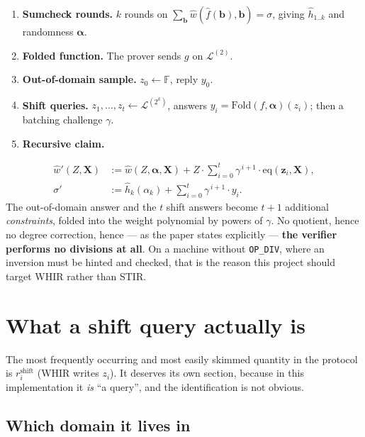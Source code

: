 \documentclass[11pt,a4paper]{article}
\newcommand{\eqp}{\mathrm{eq}}
\newcommand{\Fold}{\mathrm{Fold}}
\begin{document}
\begin{enumerate}
  \item \textbf{Sumcheck rounds.} $k$ rounds on
        $\sum_{\boldsymbol b}\hat w(\hat f(\boldsymbol b),\boldsymbol b)=\sigma$, giving
        $\hat h_{1..k}$ and randomness $\boldsymbol\alpha$.
  \item \textbf{Folded function.} The prover sends $g$ on $\mathcal{L}^{(2)}$.
  \item \textbf{Out-of-domain sample.} $z_{0}\leftarrow\mathbb{F}$, reply $y_{0}$.
  \item \textbf{Shift queries.} $z_{1},\dots,z_{t}\leftarrow\mathcal{L}^{(2^{k})}$, answers
        $y_{i}=\Fold(f,\boldsymbol\alpha)(z_{i})$; then a batching challenge $\gamma$.
  \item \textbf{Recursive claim.}
\end{enumerate}
\begin{align*}
  \hat w'(Z,\boldsymbol X) &:= \hat w(Z,\boldsymbol\alpha,\boldsymbol X)
    + Z\cdot\sum_{i=0}^{t}\gamma^{\,i+1}\cdot\eqp(\boldsymbol z_{i},\boldsymbol X),\\
  \sigma' &:= \hat h_{k}(\alpha_{k}) + \sum_{i=0}^{t}\gamma^{\,i+1}\cdot y_{i}.
\end{align*}
The out-of-domain answer and the $t$ shift answers become $t+1$ additional \emph{constraints},
folded into the weight polynomial by powers of $\gamma$. No quotient, hence no degree correction,
hence --- as the paper states explicitly --- \textbf{the verifier performs no divisions at all}. On
a machine without \texttt{OP\_DIV}, where an inversion must be hinted and checked, that is the
reason this project should target WHIR rather than STIR.

\section{What a shift query actually is}\label{sec:shift}

The most frequently occurring and most easily skimmed quantity in the protocol is
$r^{\mathrm{shift}}_{i}$ (WHIR writes $z_{i}$). It deserves its own section, because in this
implementation it \emph{is} ``a query'', and the identification is not obvious.

\subsection*{Which domain it lives in}
\end{document}
